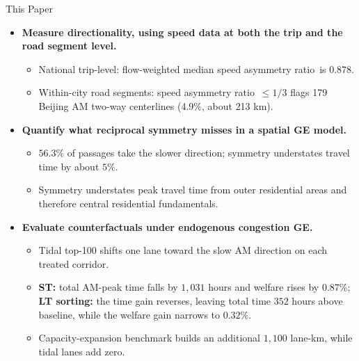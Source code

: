 \documentclass[11pt,aspectratio=169]{beamer}
\newcommand{\good}[1]{\textcolor{blue!70!black}{#1}}
\newcommand{\bad}[1]{\textcolor{red!70!black}{#1}}
\newcommand{\SAR}{speed asymmetry ratio}
\begin{document}
\begin{frame}{This Paper}
\small
\begin{itemize}
  \item \textbf{Measure directionality, using speed data at both the trip and the road segment level.}
  \begin{itemize}\footnotesize
    \item National trip-level: flow-weighted median \SAR\ is \good{0.878}.
    \item Within-city road segments: \SAR\ $\leq1/3$ flags \good{179} Beijing AM two-way centerlines (\good{4.9\%}, about \good{213 km}).
  \end{itemize}
  \item \textbf{Quantify what reciprocal symmetry misses in a spatial GE model.}
  \begin{itemize}\footnotesize
    \item \good{$56.3\%$} of passages take the slower direction; symmetry understates travel time by \good{about $5\%$}.
    \item Symmetry understates peak travel time from outer residential areas and therefore central residential fundamentals.
  \end{itemize}
  \item \textbf{Evaluate counterfactuals under endogenous congestion GE.}
  \begin{itemize}\footnotesize
    \item Tidal top-100 shifts one lane toward the slow AM direction on each treated corridor.
    \item \textbf{ST:} total AM-peak time falls by \good{$1{,}031$ hours} and welfare rises by \good{$0.87\%$}; \textbf{LT sorting:} the time gain reverses, leaving total time \bad{$352$ hours above baseline}, while the welfare gain narrows to \good{$0.32\%$}.
    \item Capacity-expansion benchmark builds an additional \good{$1{,}100$ lane-km}, while tidal lanes add \good{zero}.
  \end{itemize}
\end{itemize}
\end{frame}
\end{document}
